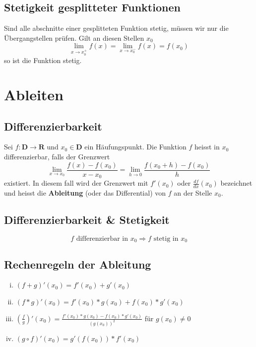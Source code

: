 \documentclass[8pt]{article}
\begin{document}
\begin{multicols*}{3}
\subsection{Stetigkeit gesplitteter Funktionen}

Sind alle abschnitte einer gesplitteten Funktion stetig, müssen wir nur die Übergangstellen prüfen.
Gilt an diesen Stellen $x_0$ $$\lim_{x \rightarrow x_0^+} f(x) = \lim_{x \rightarrow x_0^-} f(x) = f(x_0)$$
so ist die Funktion stetig.
\section{Ableiten}
\hypertarget{sec:3}{}

\subsection{Differenzierbarkeit}

Sei $f: \mathbf{D} \rightarrow \mathbf{R}$ und $x_0 \in \mathbf{D}$ ein Häufungspunkt.
Die Funktion $f$ heisst in $x_0$ differenzierbar, falls der Grenzwert $$\lim_{x \rightarrow x_0} \frac{f(x) - f(x_0)}{x - x_0} = \lim_{h \rightarrow 0} \frac{f(x_0 + h) - f(x_0)}{h}$$
existiert. In diesem fall wird der Grenzwert mit $f'(x_0)$ oder $\frac{df}{dx} (x_0)$ bezeichnet und heisst die \textbf{Ableitung}
(oder das Differential) von $f$ an der Stelle $x_0$.

\subsection{Differenzierbarkeit \& Stetigkeit}

$$
  f \text{ differenzierbar in } x_0 \Rightarrow f \text{ stetig in } x_0
$$

\subsection{Rechenregeln der Ableitung}

\begin{enumerate}[(i)]
  \item $(f + g)'(x_0) = f'(x_0) + g'(x_0)$
  \item $(f * g)'(x_0) = f'(x_0)*g(x_0) + f(x_0)*g'(x_0)$
  \item $(\frac{f}{g})'(x_0) = \frac{f'(x_0) * g(x_0) - f(x_0) * g'(x_0)}{(g(x_0))^2}$ für $g(x_0) \neq 0$
  \item $(g \circ f)'(x_0) = g'(f(x_0)) * f'(x_0)$
\end{enumerate}


\end{multicols*}
\end{document}
